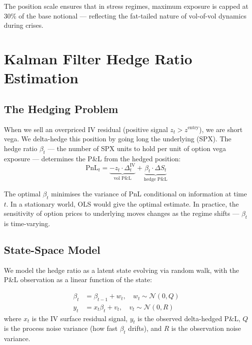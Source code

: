 \documentclass[12pt, letterpaper]{article}
\begin{document}
The position scale ensures that in stress regimes, maximum exposure is capped
at 30\% of the base notional — reflecting the fat-tailed nature of vol-of-vol
dynamics during crises.

\section{Kalman Filter Hedge Ratio Estimation}
\label{sec:kalman}

\subsection{The Hedging Problem}

When we sell an overpriced IV residual (positive signal $z_t > z^{\text{entry}}$),
we are short vega. We delta-hedge this position by going long the underlying (SPX).
The hedge ratio $\beta_t$ — the number of SPX units to hold per unit of option
vega exposure — determines the P\&L from the hedged position:
\begin{equation}
  \text{PnL}_t = \underbrace{-z_t \cdot \Delta^{\text{IV}}_t}_{\text{vol P\&L}}
               + \underbrace{\beta_t \cdot \Delta S_t}_{\text{hedge P\&L}}
  \label{eq:hedged_pnl}
\end{equation}

The optimal $\beta_t$ minimises the variance of PnL conditional on information
at time $t$. In a stationary world, OLS would give the optimal estimate.
In practice, the sensitivity of option prices to underlying moves changes as
the regime shifts — $\beta_t$ is time-varying.

\subsection{State-Space Model}

We model the hedge ratio as a latent state evolving via random walk, with the
P\&L observation as a linear function of the state:

\begin{align}
  \beta_t &= \beta_{t-1} + w_t, \quad w_t \sim \mathcal{N}(0, Q) \tag{State equation} \label{eq:state}\\
  y_t &= x_t \beta_t + v_t, \quad v_t \sim \mathcal{N}(0, R) \tag{Observation equation} \label{eq:obs}
\end{align}
where $x_t$ is the IV surface residual signal, $y_t$ is the observed delta-hedged
P\&L, $Q$ is the process noise variance (how fast $\beta_t$ drifts), and $R$ is
the observation noise variance.
\end{document}
